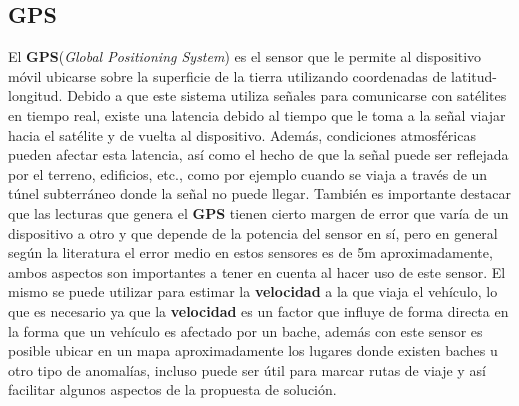 	\subsection{GPS}
		El \textbf{GPS}(\emph{Global Positioning System}) es el sensor que le permite al dispositivo móvil ubicarse sobre la
		superficie de la tierra utilizando coordenadas de latitud-longitud. Debido a que este sistema utiliza señales para
		comunicarse con satélites en tiempo real, existe una latencia debido al tiempo que le toma a la señal viajar hacia el
		satélite y de vuelta al dispositivo. Además, condiciones atmosféricas pueden afectar esta latencia, así como el hecho
		de que la señal puede ser reflejada por el terreno, edificios, etc., como por ejemplo cuando se viaja a través de un
		túnel subterráneo donde la señal no puede llegar. También es importante destacar que las lecturas que genera el \textbf
		{GPS} tienen cierto margen de error que varía de un dispositivo a otro y que depende de la potencia del sensor en sí,
		pero en general según la literatura el error medio en estos sensores es de 5m aproximadamente, ambos aspectos son
		importantes a tener en cuenta al hacer uso de este sensor. El mismo se puede utilizar para estimar la \textbf{velocidad}
		a la que viaja el vehículo, lo que es necesario ya que la \textbf{velocidad} es un factor que influye de forma directa en
		la forma que un vehículo es afectado por un bache, además con este sensor es posible ubicar en un mapa aproximadamente los
		lugares donde existen baches u otro tipo de anomalías, incluso puede ser útil para marcar rutas de viaje y así facilitar
		algunos aspectos de la propuesta de solución.

